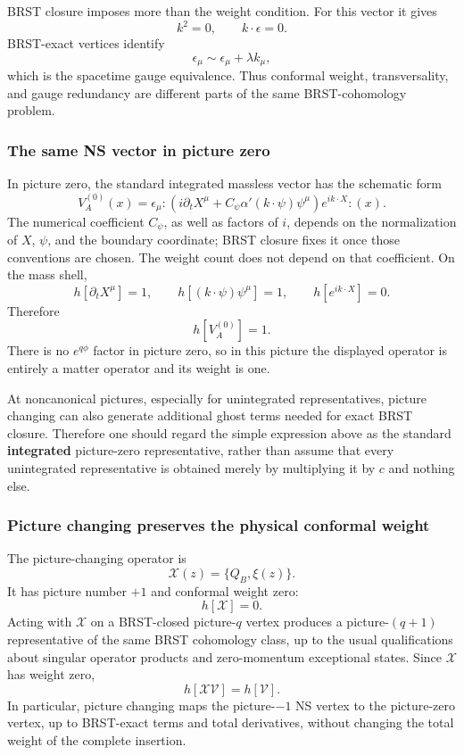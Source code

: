 \documentclass[
  10pt,
  a4paper,
  openany]{book}
\begin{document}
BRST closure imposes more than the weight condition. For this vector it
gives \[
k^2=0,
\qquad
k\cdot\epsilon=0.
\] BRST-exact vertices identify \[
\epsilon_\mu\sim\epsilon_\mu+\lambda k_\mu,
\] which is the spacetime gauge equivalence. Thus conformal weight,
transversality, and gauge redundancy are different parts of the same
BRST-cohomology problem.

\subsubsection{The same NS vector in picture
zero}\label{the-same-ns-vector-in-picture-zero}

In picture zero, the standard integrated massless vector has the
schematic form \[
V_A^{(0)}(x)
=\epsilon_\mu:
\left(
i\partial_tX^\mu
+C_{\psi}\alpha'(k\cdot\psi)\psi^\mu
\right)e^{ik\cdot X}:(x).
\] The numerical coefficient \(C_{\psi}\), as well as factors of \(i\),
depends on the normalization of \(X\), \(\psi\), and the boundary
coordinate; BRST closure fixes it once those conventions are chosen. The
weight count does not depend on that coefficient. On the mass shell, \[
h[\partial_tX^\mu]=1,
\qquad
h[(k\cdot\psi)\psi^\mu]=1,
\qquad
h[e^{ik\cdot X}]=0.
\] Therefore \[
h[V_A^{(0)}]=1.
\] There is no \(e^{q\phi}\) factor in picture zero, so in this picture
the displayed operator is entirely a matter operator and its weight is
one.

At noncanonical pictures, especially for unintegrated representatives,
picture changing can also generate additional ghost terms needed for
exact BRST closure. Therefore one should regard the simple expression
above as the standard \textbf{integrated} picture-zero representative,
rather than assume that every unintegrated representative is obtained
merely by multiplying it by \(c\) and nothing else.

\subsubsection{Picture changing preserves the physical conformal
weight}\label{picture-changing-preserves-the-physical-conformal-weight}

The picture-changing operator is \[
\mathcal X(z)=\{Q_B,\xi(z)\}.
\] It has picture number \(+1\) and conformal weight zero: \[
h[\mathcal X]=0.
\] Acting with \(\mathcal X\) on a BRST-closed picture-\(q\) vertex
produces a picture-\((q+1)\) representative of the same BRST cohomology
class, up to the usual qualifications about singular operator products
and zero-momentum exceptional states. Since \(\mathcal X\) has weight
zero, \[
h[\mathcal X\mathcal V]=h[\mathcal V].
\] In particular, picture changing maps the picture-\(-1\) NS vertex to
the picture-zero vertex, up to BRST-exact terms and total derivatives,
without changing the total weight of the complete insertion.
\end{document}
